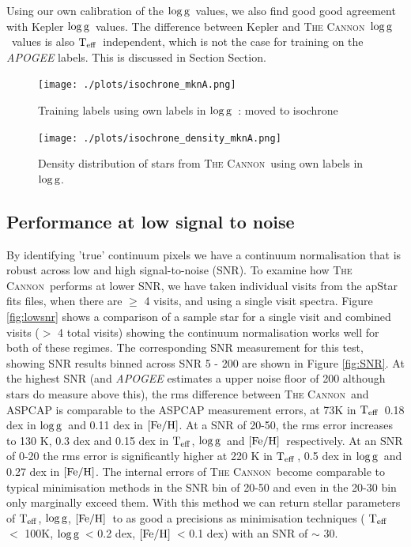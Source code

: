 \documentclass[12pt, preprint]{aastex}
\newcommand{\sectionname}{Section}
\newcommand{\teff}{\mbox{$\rm T_{eff}$}}
\newcommand{\feh}{\mbox{$\rm [Fe/H]$}}
\newcommand{\logg}{\mbox{$\rm \log g$}}
\newcommand{\tc}{\textsc{The Cannon}}
\begin{document}
Using our own calibration of the \logg\ values, we also find good  good agreement with Kepler \logg\ values. The difference between Kepler and \tc\ \logg\ values is also \teff\ independent, which is not the case for training on the \textit{APOGEE} labels. This is discussed in Section \sectionname{}.  


\begin{figure}[h!]
  \texttt{[image: ./plots/isochrone\_mknA.png]}
\caption{Training labels using own labels in \logg\ : moved to isochrone}
\label{fig:mknA}
\end{figure}

\begin{figure}[h!]
  \texttt{[image: ./plots/isochrone\_density\_mknA.png]}
\caption{Density distribution of stars from \tc\ using own labels in \logg.}
\label{fig:iso_density}
\end{figure}

 \subsection{Performance at low signal to noise}

By identifying 'true' continuum pixels we have a continuum normalisation that is robust across low and high signal-to-noise (SNR). To examine how \tc\ performs at lower SNR, we have taken individual visits from the apStar fits files, when there are $\ge$ 4 visits, and using a single visit spectra. Figure \ref{fig:lowsnr} shows a comparison of a sample star for a single visit and combined visits ($>$ 4 total visits) showing the continuum normalisation works well for both of these regimes. The corresponding SNR measurement for this test,  showing SNR results binned  across SNR 5 - 200 are shown in Figure \ref{fig:SNR}.  At the highest SNR (and \textit{APOGEE} estimates a upper noise floor of 200 although stars do measure above this), the rms difference between \tc\ and ASPCAP is comparable to the ASPCAP measurement errors, at 73K in \teff\, 0.18 dex in \logg\ and 0.11 dex in \feh.  At a SNR of 20-50, the rms error increases to 130 K, 0.3 dex and 0.15 dex in \teff, \logg\ and \feh\, respectively. At an SNR of 0-20 the rms error is significantly higher at 220 K in \teff\,, 0.5 dex in \logg\ and 0.27 dex in \feh. The internal errors of \tc\ become comparable to typical minimisation methods in the SNR bin of 20-50 and even in the 20-30 bin only marginally exceed them. With this method we can return stellar parameters of \teff, \logg, \feh\ to as good a precisions as minimisation techniques ( \teff\ $<$ 100K, \logg\ < 0.2 dex, \feh\ < 0.1 dex) with an SNR of $\sim$ 30. 
\end{document}

